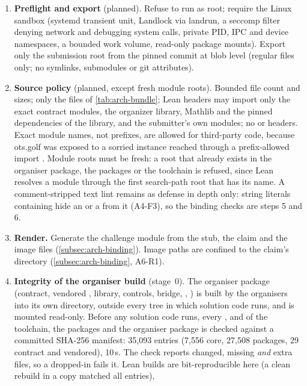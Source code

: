 \begin{enumerate}[leftmargin=1.5em,itemsep=2pt]
\item \textbf{Preflight and export} (planned). Refuse to run as root; require the Linux sandbox (systemd
  transient unit, Landlock via landrun, a seccomp filter denying network and debugging system
  calls, private PID, IPC and device namespaces, a bounded work volume, read-only package mounts).
  Export only the submission root from the pinned commit at blob level (regular files only; no
  symlinks, submodules or git attributes).
\item \textbf{Source policy} (planned, except fresh module roots). Bounded file count and sizes; only the files of
  \cref{tab:arch-bundle}; Lean headers may import only the exact contract modules, the organizer
  library, Mathlib and the pinned dependencies of the library, and the submitter's own modules; no
   or  headers. Exact module names, not prefixes, are allowed for
  third-party code, because ots.golf was exposed to a sorried instance reached through a
  prefix-allowed import \cite{otsgolf2026}. Module roots must be fresh: a root that already exists in
  the organiser package, the packages or the toolchain is refused, since Lean resolves a module
  through the first search-path root that has its name. A comment-stripped text lint remains as
  defense in depth only: string literals containing \code{/-} hide an  or a
   from it (A4-F3), so the binding checks are steps 5 and 6.
\item \textbf{Render.} Generate the challenge module from the stub, the claim and the image files
  (\cref{subsec:arch-binding}). Image paths are confined to the claim's directory
  (\cref{subsec:arch-binding}, A6-R1).
\item \textbf{Integrity of the organiser build} (stage~0). The organiser package (contract, vendored
  , library, controls, bridge, , ) is built by the organisers
  into its own directory, outside every tree in which solution code runs, and is mounted read-only.
  Before any solution code runs, every ,  and 
  of the toolchain, the packages and the organiser package is checked against a committed SHA-256
  manifest: 35,093 entries (7,556 core, 27,508 packages, 29 contract and vendored), 10\,s. The
  check reports changed, missing \emph{and} extra files, so a dropped-in 
  fails it. Lean builds are bit-reproducible here (a clean rebuild in a copy matched all entries),

\end{enumerate}
